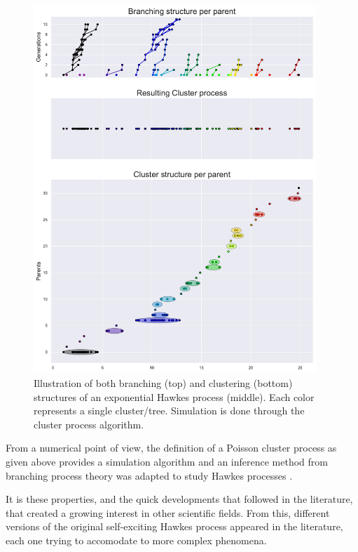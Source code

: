     \begin{figure}[!ht]
      \centering
        \includegraphics[width=0.95\textwidth]{images/chapter0/branching_and_cluster05.pdf}
      \caption{Illustration of both branching (top) and clustering (bottom) structures of an exponential Hawkes process (middle). Each color represents a single cluster/tree. Simulation is done through the cluster process algorithm.
      }
      \label{fig:branching_and_cluster05}
    \end{figure}

    From a numerical point of view, the definition of a Poisson cluster process as given above provides a simulation algorithm and an inference method from branching process theory was adapted to study Hawkes processes \parencite{Veen2008}.

    It is these properties, and the quick developments that followed in the literature, that created a growing interest in other scientific fields.
    From this, different versions of the original self-exciting Hawkes process appeared in the literature, each one trying to accomodate to more complex phenomena.

